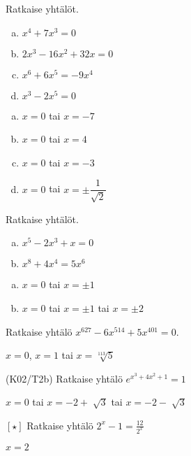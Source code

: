 \begin{tehtava}
    Ratkaise yhtälöt.
    \begin{enumerate}[a)]
        \item $x^4 + 7x^3 = 0$
        \item $2x^3 - 16x^2 + 32x = 0$
        \item $x^6 + 6x^5 = -9x^4$
        \item $x^3 - 2x^5 = 0$      
    \end{enumerate}
    \begin{vastaus}
        \begin{enumerate}[a)]
        	\item $x = 0$ tai $x = -7$
        	\item $x = 0$ tai $x = 4$
        	\item $x = 0$ tai $x = -3$
            \item $x = 0$ tai $x = \pm\dfrac{1}{\sqrt{2}}$
        \end{enumerate}
    \end{vastaus}
\end{tehtava}

\begin{tehtava}
    Ratkaise yhtälöt.
    \begin{enumerate}[a)]
        \item $x^5 - 2x^3 + x = 0$
        \item $x^8 + 4x^4 = 5x^6$       
    \end{enumerate}
    \begin{vastaus}
        \begin{enumerate}[a)]
        	\item $x = 0$ tai $x = \pm1$
        	\item $x = 0$ tai $x = \pm1$ tai $x = \pm2$
        \end{enumerate}
    \end{vastaus}
\end{tehtava}

\begin{tehtava}
	Ratkaise yhtälö $x^{627} - 6x^{514} + 5x^{401} = 0$.
	\begin{vastaus}
		$x = 0$, $x = 1$ tai $x = \sqrt[113]{5}$
	\end{vastaus}
\end{tehtava}

\begin{tehtava}
	(K02/T2b) Ratkaise yhtälö $e^{x^3+4x^2+1}=1$
	\begin{vastaus}
	$x=0$ tai $x=-2 + \sqrt[]{3}$ tai $x=-2 - \sqrt[]{3}$
	\end{vastaus}
\end{tehtava}

\begin{tehtava}
	$[ \star ]$ Ratkaise yhtälö $2^x-1=\frac{12}{2^x}$
	\begin{vastaus}
	$x=2$
	\end{vastaus}
\end{tehtava}
